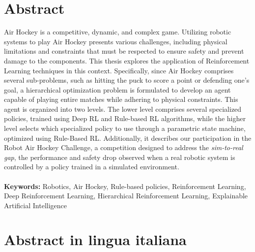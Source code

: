 \startpreamble
\setcounter{page}{1} %

\chapter*{Abstract} 
Air Hockey is a competitive, dynamic, and complex game. 
Utilizing robotic systems to play Air Hockey presents various challenges, including physical limitations and constraints that must 
be respected to ensure safety and prevent damage to the components. 
This thesis explores the application of Reinforcement Learning techniques in this context. 
Specifically, since Air Hockey comprises several sub-problems, such as hitting the puck to score a point or defending one's goal, 
a hierarchical optimization problem is formulated to develop an agent capable of playing entire matches while adhering to physical constraints. 
This agent is organized into two levels. The lower level comprises several specialized policies, trained using Deep RL and Rule-based RL algorithms, 
while the higher level selects which specialized policy to use through a parametric state machine, optimized using Rule-Based RL. 
Additionally, it describes our participation in the Robot Air Hockey Challenge, a competition designed to address the \textit{sim-to-real gap}, 
the performance and safety drop observed when a real robotic system is controlled by a policy trained in a simulated environment.
\\
\\
\textbf{Keywords:} Robotics, Air Hockey, Rule-based policies, Reinforcement Learning, Deep Reinforcement Learning, Hierarchical Reinforcement Learning,
Explainable Artificial Intelligence %

\chapter*{Abstract in lingua italiana}

